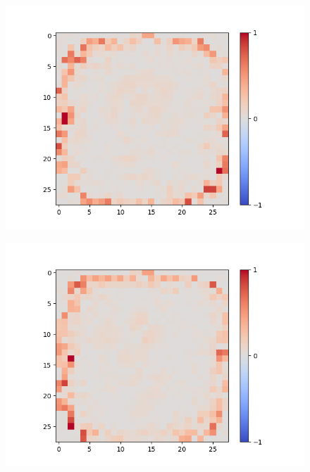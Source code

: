 \begin{figure}[H]
	\centering
	\begin{minipage}[b]{0.19\textwidth}
		\captionsetup{labelformat=empty}
		\includegraphics[width=\textwidth]{SAE(20LF)/Feature-0.png}
		\label{}
	\end{minipage}
	\begin{minipage}[b]{0.19\textwidth}
		\captionsetup{labelformat=empty}
		\includegraphics[width=\textwidth]{SAE(20LF)/Feature-6.png}
		\label{}
	\end{minipage}
	\begin{minipage}[b]{0.19\textwidth}
		\captionsetup{labelformat=empty}

\end{minipage}
\end{figure}
